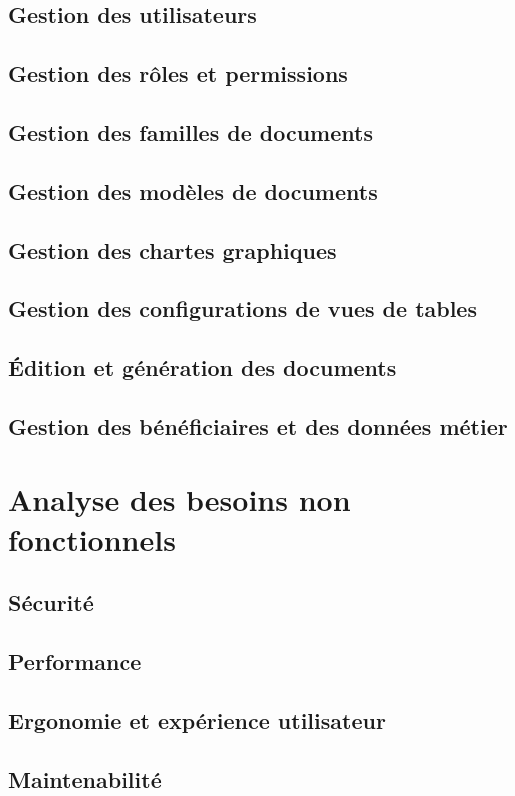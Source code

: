 \documentclass[12pt,a4paper]{report}
\begin{document}
\subsection{Gestion des utilisateurs}
\subsection{Gestion des rôles et permissions}
\subsection{Gestion des familles de documents}
\subsection{Gestion des modèles de documents}
\subsection{Gestion des chartes graphiques}
\subsection{Gestion des configurations de vues de tables}
\subsection{Édition et génération des documents}
\subsection{Gestion des bénéficiaires et des données métier}

\section{Analyse des besoins non fonctionnels}
\subsection{Sécurité}
\subsection{Performance}
\subsection{Ergonomie et expérience utilisateur}
\subsection{Maintenabilité}
\end{document}
